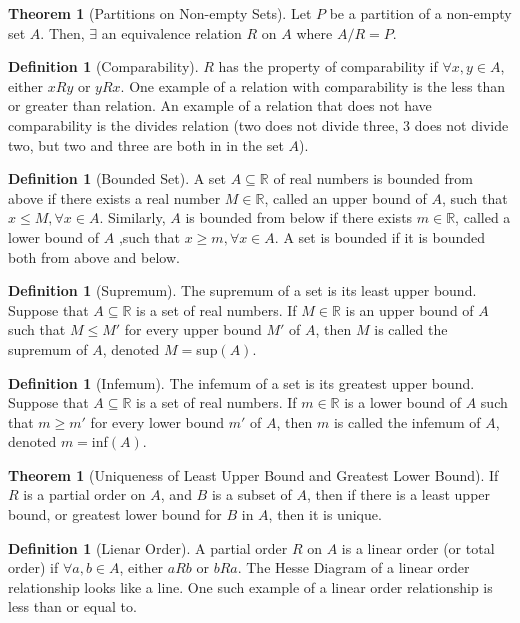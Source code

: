 \documentclass[10pt]{article}
\theoremstyle{definition}
\newtheorem{definition}[equation]{Definition}
\newtheorem{theorem}[equation]{Theorem}
\newcommand{\R}{\mathbb{R}}
\begin{document}
\begin{theorem}[Partitions on Non-empty Sets]
  Let $P$ be a partition of a non-empty set $A$. Then, $\exists$ an equivalence relation $R$ on $A$ where $A/R=P$.
\end{theorem}

\begin{definition}[Comparability]
  $R$ has the property of comparability if $\forall x,y\in A$, either $xRy$ or $yRx$. One example of a relation with comparability is the less than or greater than relation. An example of a relation that does not have comparability is the divides relation (two does not divide three, 3 does not divide two, but two and three are both in in the set $A$).
\end{definition}

\begin{definition}[Bounded Set]
  A set $A\subseteq\R$ of real numbers is bounded from above if there exists a real number $M\in\R$, called an upper bound of $A$, such that $x\leq M, \forall x\in A$. Similarly, $A$ is bounded from below if there exists $m\in\R$, called a lower bound of $A$ ,such that $x\geq m,\forall x\in A$. A set is bounded if it is bounded both from above and below.
\end{definition}

\begin{definition}[Supremum]
  The supremum of a set is its least upper bound. Suppose that $A\subseteq\R$ is a set of real numbers. If $M\in\R$ is an upper bound of $A$ such that $M\leq M′$ for every upper bound $M′$ of $A$, then $M$ is called the supremum of $A$, denoted $M = $sup$(A)$.
\end{definition}

\begin{definition}[Infemum]
  The infemum of a set is its greatest upper bound. Suppose that $A\subseteq\R$ is a set of real numbers. If $m\in\R$ is a lower bound of $A$ such that $m\geq m′$ for every lower bound $m′$ of $A$, then $m$ is called the infemum of $A$, denoted $m = $inf$(A)$.
\end{definition}

\begin{theorem}[Uniqueness of Least Upper Bound and Greatest Lower Bound]
  If $R$ is a partial order on $A$, and $B$ is a subset of $A$, then if there is a least upper bound, or greatest lower bound for $B$ in $A$, then it is unique.
\end{theorem}

\begin{definition}[Lienar Order]
  A partial order $R$ on $A$ is a linear order (or total order) if $\forall a,b\in A$, either $aRb$ or $bRa$. The Hesse Diagram of a linear order relationship looks like a line. One such example of a linear order relationship is less than or equal to.
\end{definition}
\end{document}
